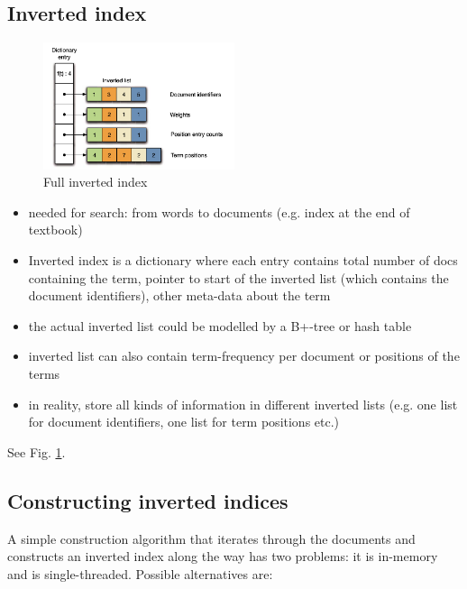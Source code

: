 \subsection{Inverted index}
\begin{figure}[ht]
    \centering
    \includegraphics[width=0.5\textwidth]{figures/inverted_index.png}
    \caption{Full inverted index}
    \label{inverted_index}
\end{figure}
\begin{itemize}
    \item needed for search: from words to documents (e.g. index at the end of textbook)
    \item Inverted index is a dictionary where each entry contains total number of docs containing the term, pointer to start of the inverted list (which contains the document identifiers), other meta-data about the term
    \item the actual inverted list could be modelled by a B+-tree or hash table
    \item inverted list can also contain term-frequency per document or positions of the terms
    \item in reality, store all kinds of information in different inverted lists (e.g. one list for document identifiers, one list for term positions etc.)
\end{itemize}
See Fig. \ref{inverted_index}.

\subsection{Constructing inverted indices}
A simple construction algorithm that iterates through the documents and constructs an inverted index along the way has two problems: it is in-memory and is single-threaded.
Possible alternatives are:

